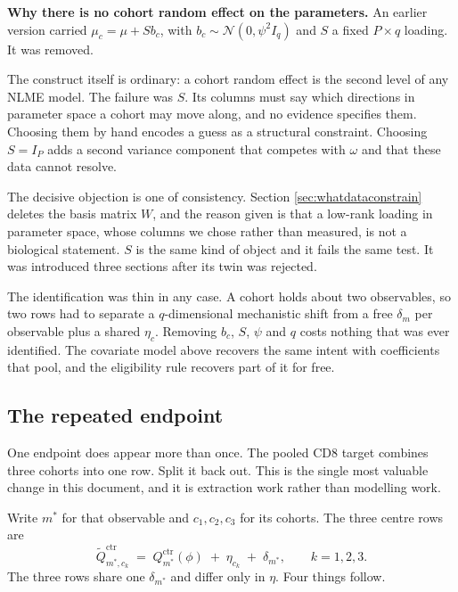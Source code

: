 \documentclass[11pt]{article}
\newcommand{\Ncal}{\mathcal{N}}
\newcommand{\ctr}{\mathrm{ctr}}
\begin{document}
\begin{notebox}
\textbf{Why there is no cohort random effect on the parameters.} An earlier
version carried $\mu_c=\mu+Sb_c$, with $b_c\sim\Ncal(0,\psi^2I_q)$ and $S$ a
fixed $P\times q$ loading. It was removed.

The construct itself is ordinary: a cohort random effect is the second level of
any NLME model. The failure was $S$. Its columns must say which directions in
parameter space a cohort may move along, and no evidence specifies them. Choosing
them by hand encodes a guess as a structural constraint. Choosing $S=I_P$ adds a
second variance component that competes with $\omega$ and that these data cannot
resolve.

The decisive objection is one of consistency. Section \ref{sec:whatdataconstrain}
deletes the basis matrix $W$, and the reason given is that a low-rank loading in
parameter space, whose columns we chose rather than measured, is not a biological
statement. $S$ is the same kind of object and it fails the same test. It was
introduced three sections after its twin was rejected.

The identification was thin in any case. A cohort holds about two observables, so
two rows had to separate a $q$-dimensional mechanistic shift from a free
$\delta_m$ per observable plus a shared $\eta_c$. Removing $b_c$, $S$, $\psi$ and
$q$ costs nothing that was ever identified. The covariate model above recovers
the same intent with coefficients that pool, and the eligibility rule recovers
part of it for free.
\end{notebox}

\subsection{The repeated endpoint}
\label{sec:repeat}

One endpoint does appear more than once. The pooled CD8 target combines three
cohorts into one row. Split it back out. This is the single most valuable change
in this document, and it is extraction work rather than modelling work.

Write $m^\ast$ for that observable and $c_1,c_2,c_3$ for its cohorts. The three
centre rows are
\begin{equation}
\widetilde Q^\ctr_{m^\ast,c_k} \;=\; Q^\ctr_{m^\ast}(\phi) \;+\; \eta_{c_k} \;+\;
\delta_{m^\ast},
\qquad k=1,2,3 .
\end{equation}
The three rows share one $\delta_{m^\ast}$ and differ only in $\eta$. Four things
follow.
\end{document}
